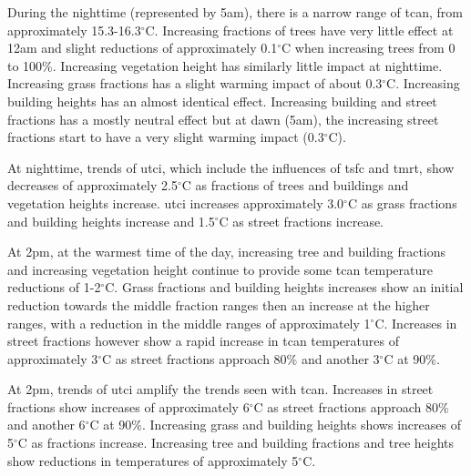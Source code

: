 \documentclass[final,3p,times,authoryear]{elsarticle}
\begin{document}


During the nighttime (represented by 5am), there is a narrow range of \gls{tcan}, from approximately 15.3-16.3$^{\circ}$C. Increasing fractions of trees have very little effect at 12am and slight reductions of approximately 0.1$^{\circ}$C when increasing trees from 0 to 100\%. Increasing vegetation height has similarly little impact at nighttime. Increasing grass fractions has a slight warming impact of about 0.3$^{\circ}$C. Increasing building heights has an almost identical effect. Increasing building and street fractions has a mostly neutral effect but at dawn (5am), the increasing street fractions start to have a very slight warming impact (0.3$^{\circ}$C). 


At nighttime, trends of \gls{utci}, which include the influences of \gls{tsfc} and \gls{tmrt}, show decreases of approximately 2.5$^{\circ}$C as fractions of trees and buildings and vegetation heights increase. \gls{utci} increases approximately 3.0$^{\circ}$C as grass fractions and building heights increase and 1.5$^{\circ}$C as street fractions increase.

At 2pm, at the warmest time of the day, increasing tree and building fractions and increasing vegetation height continue to provide some \gls{tcan} temperature reductions of 1-2$^{\circ}$C. Grass fractions and building heights increases show an initial reduction towards the middle fraction ranges then an increase at the higher ranges, with a reduction in the middle ranges of approximately 1$^{\circ}$C. Increases in street fractions however show a rapid increase in \gls{tcan} temperatures of approximately 3$^{\circ}$C as street fractions approach 80\% and another 3$^{\circ}$C at 90\%.

At 2pm, trends of \gls{utci} amplify the trends seen with \gls{tcan}. Increases in street fractions show increases of approximately 6$^{\circ}$C as street fractions approach 80\% and another 6$^{\circ}$C at 90\%. Increasing grass and building heights shows increases of 5$^{\circ}$C as fractions increase. Increasing tree and building fractions and tree heights show reductions in temperatures of approximately 5$^{\circ}$C.
\end{document}
